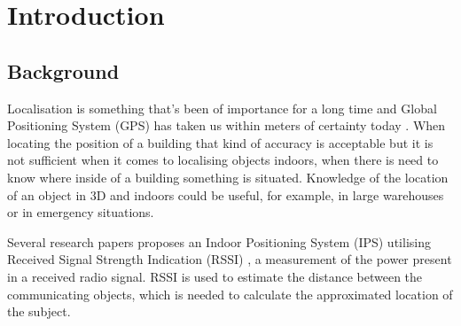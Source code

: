 \section{Introduction}

\subsection{Background}
Localisation is something that's been of importance for a long time and Global Positioning System (GPS) has taken us within meters of certainty today \cite{_gps.gov:_2015}. When locating the position of a building that kind of accuracy is acceptable but it is not sufficient when it comes to localising objects indoors, when there is need to know where inside of a building something is situated. Knowledge of the location of an object in 3D and indoors could be useful, for example,  in large warehouses or in emergency situations.

Several research papers proposes an Indoor Positioning System (IPS) utilising Received Signal Strength Indication (RSSI) 
\cite{lee_3d-localization---mobile-beacon.pdf_2012,kim_mobile_2010,hassan_indoor_2010}, a measurement of the power present in a received radio signal. RSSI is used to estimate the distance between the communicating objects, which is needed to calculate the approximated location of the subject. 


\clearpage